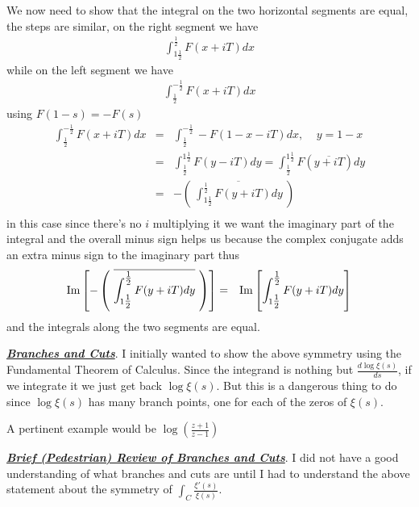 \documentclass[aps,preprint,preprintnumbers,nofootinbib,showpacs,prd]{revtex4-1}
\newcommand{\nbea}{\begin{eqnarray*}}
\newcommand{\neea}{\end{eqnarray*}}
\def\Im{{\rm Im}}
\begin{document}
We now need to show that the integral on the two horizontal segments are equal, the steps are similar, on the right segment we have
%
\nbea
\int_{1\tfrac{1}{2}}^{\tfrac{1}{2}} F(x + iT) dx
\neea
%
while on the left segment we have
%
\nbea
\int_{\tfrac{1}{2}}^{-\tfrac{1}{2}} F(x + iT) dx
\neea
%
using $F(1 - s) = -F(s)$
%
\nbea
\int_{\tfrac{1}{2}}^{-\tfrac{1}{2}} F(x + iT) dx & = & \int_{\tfrac{1}{2}}^{-\tfrac{1}{2}} -F(1-x - iT) dx, ~~~~~ y = 1-x \\
& = & \int_{\tfrac{1}{2}}^{1\tfrac{1}{2}} F(y - iT) dy = \int_{\tfrac{1}{2}}^{1\tfrac{1}{2}} F(\overline{y + iT}) dy \\
& = & -\left ( ~ \overline{\int_{1\tfrac{1}{2}}^{\tfrac{1}{2}} F(y + iT) dy} ~ \right ) \\
\neea
%
in this case since there's no $i$ multiplying it we want the imaginary part of the integral and the overall minus sign helps us because the complex conjugate adds an extra minus sign to the imaginary part thus
%
\nbea
\Im\left \lbrack - \left ( ~ \overline{\int_{1\tfrac{1}{2}}^{\tfrac{1}{2}} F(y + iT) dy} ~ \right ) \right \rbrack & = & \Im \left \lbrack \int_{1\tfrac{1}{2}}^{\tfrac{1}{2}} F(y + iT) dy \right \rbrack
\neea
%
and the integrals along the two segments are equal.

\bigskip
\underline{\textit{\textbf{Branches and Cuts}}}. I initially wanted to show the above symmetry using the Fundamental Theorem of Calculus. Since the integrand is nothing but $\frac{d\log\xi(s)}{ds}$, if we integrate it we just get back $\log\xi(s)$. But this is a dangerous thing to do since $\log\xi(s)$ has many branch points, one for each of the zeros of $\xi(s)$.

A pertinent example would be $\log\left ( \tfrac{z+1}{z-1}\right )$


\bigskip
\underline{\textit{\textbf{Brief (Pedestrian) Review of Branches and Cuts}}}. I did not have a good understanding of what branches and cuts are until I had to understand the above statement about the symmetry of $\int_C \frac{\xi'(s)}{\xi(s)}$. 
\end{document}
